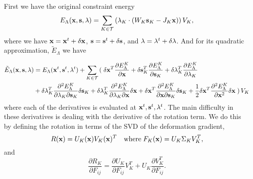First we have the original constraint energy
\begin{equation}
E_\Lambda (\mathbf{x}, \mathbf{s}, \mathbf{\lambda}) = \sum_{K \in \mathcal{T}} \left( \mathbf{\lambda}_K \cdot (W_K \mathbf{s}_K - J_K \mathbf{x}) \right) V_K,
\end{equation}
where we have $\mathbf{x} = \mathbf{x}^t + \delta \mathbf{x}$, $\mathbf{s} = \mathbf{s}^t + \delta \mathbf{s}$, and $\mathbf{\lambda} = \mathbf{\lambda}^t + \delta \mathbf{\lambda}$. And for its quadratic approximation, $\tilde{E}_\Lambda$ we have

\begin{equation}
\begin{split}
\tilde{E}_\Lambda (\mathbf{x}, \mathbf{s}, \mathbf{\lambda}) &=  E_\Lambda (\mathbf{x}^t,\mathbf{s}^t,\mathbf{\lambda}^t) 
+ \sum_{K \in \mathcal{T}} \left( \right.
  \delta \mathbf{x}^T \frac{\partial E_\Lambda^K}{\partial \mathbf{x}} 
+ \delta \mathbf{s}_K^T \frac{\partial E_\Lambda^K}{\partial \mathbf{s}_K}
+ \delta \mathbf{\lambda}_K^T \frac{\partial E_\Lambda^K}{\partial \mathbf{\lambda}_K} \\
&+ \delta \mathbf{\lambda}_K^T \frac{\partial^2 E_\Lambda^K}{\partial \mathbf{\lambda}_K \partial \mathbf{s}_K} \delta \mathbf{s}_K
+ \delta \mathbf{\lambda}_K^T \frac{\partial^2 E_\Lambda^K}{\partial \mathbf{\lambda}_K \partial \mathbf{x}} \delta \mathbf{x}
+ \delta \mathbf{x}^T \frac{\partial^2 E_\Lambda^K}{\partial \mathbf{x} \partial \mathbf{s}_K} \delta \mathbf{s}_K
+ \frac{1}{2} \delta \mathbf{x}^T \frac{\partial^2 E_\Lambda^K}{\partial \mathbf{x}^2} \delta \mathbf{x}
\left. \right) V_K
\end{split}
\end{equation}
where each of the derivatives is evaluated at $\mathbf{x}^t, \mathbf{s}^t, \mathbf{\lambda}^t$. The main difficulty in these derivatives is dealing with the derivative of the rotation term. We do this by defining the rotation in terms of the SVD of the deformation gradient,
\begin{equation}
R(\mathbf{x}) = U_K(\mathbf{x}) V_K(\mathbf{x})^T \quad \text{where} \; F_K(\mathbf{x}) = U_K \Sigma_K V_K^T,
\end{equation}
and
\begin{equation}
\frac{\partial R_K}{\partial F_{ij}} = \frac{\partial U_K}{\partial F_{ij}}V_K^T
+ U_K \frac{\partial V_K^T}{\partial F_{ij}}.
\end{equation}


